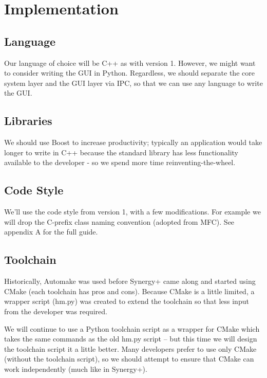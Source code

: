 \section{Implementation}

\subsection{Language}

Our language of choice will be C++ as with version 1. However, we might want to
consider writing the GUI in Python. Regardless, we should separate the core 
system layer and the GUI layer via IPC, so that we can use any language to 
write the GUI.

\subsection{Libraries}

We should use Boost to increase productivity; typically an application would
take longer to write in C++ because the standard library has less functionality
available to the developer - so we spend more time reinventing-the-wheel.

\subsection{Code Style}

We'll use the code style from version 1, with a few modifications. For example 
we will drop the C-prefix class naming convention (adopted from MFC). See 
appendix A for the full guide.

\subsection{Toolchain}

Historically, Automake was used before Synergy+ came along and started using
CMake (each toolchain has pros and cons). Because CMake is a little limited, a 
wrapper script (hm.py) was created to extend the toolchain so that less input 
from the developer was required.

We will continue to use a Python toolchain script as a wrapper for CMake which
takes the same commands as the old hm.py script -- but this time we will design 
the toolchain script it a little better. Many developers prefer to use only
CMake (without the toolchain script), so we should attempt to ensure that CMake
can work independently (much like in Synergy+).

